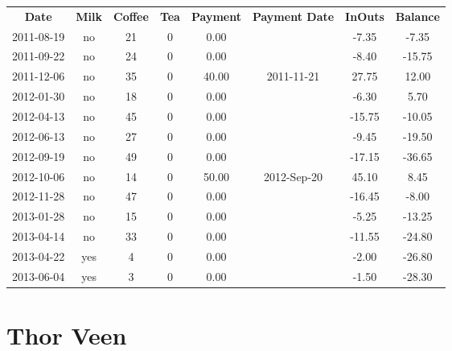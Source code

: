 \begin{center}
\begin{tabular}{cccccccc}
\textbf{Date} & \textbf{Milk} & \textbf{Coffee} & \textbf{Tea} & \textbf{Payment} & \textbf{Payment Date} & \textbf{InOuts} & \textbf{Balance} \\
2011-08-19 & no & 21 & 0 &  0.00 &  &  -7.35 &  -7.35\\ 
2011-09-22 & no & 24 & 0 &  0.00 &  &  -8.40 & -15.75\\ 
2011-12-06 & no & 35 & 0 & 40.00 & 2011-11-21 &  27.75 &  12.00\\ 
2012-01-30 & no & 18 & 0 &  0.00 &  &  -6.30 &   5.70\\ 
2012-04-13 & no & 45 & 0 &  0.00 &  & -15.75 & -10.05\\ 
2012-06-13 & no & 27 & 0 &  0.00 &  &  -9.45 & -19.50\\ 
2012-09-19 & no & 49 & 0 &  0.00 &  & -17.15 & -36.65\\ 
2012-10-06 & no & 14 & 0 & 50.00 & 2012-Sep-20 &  45.10 &   8.45\\ 
2012-11-28 & no & 47 & 0 &  0.00 &  & -16.45 &  -8.00\\ 
2013-01-28 & no & 15 & 0 &  0.00 &  &  -5.25 & -13.25\\ 
2013-04-14 & no & 33 & 0 &  0.00 &  & -11.55 & -24.80\\ 
2013-04-22 & yes &  4 & 0 &  0.00 &  &  -2.00 & -26.80\\ 
2013-06-04 & yes &  3 & 0 &  0.00 &  &  -1.50 & -28.30
\end{tabular}
\end{center}

\section{Thor Veen}

